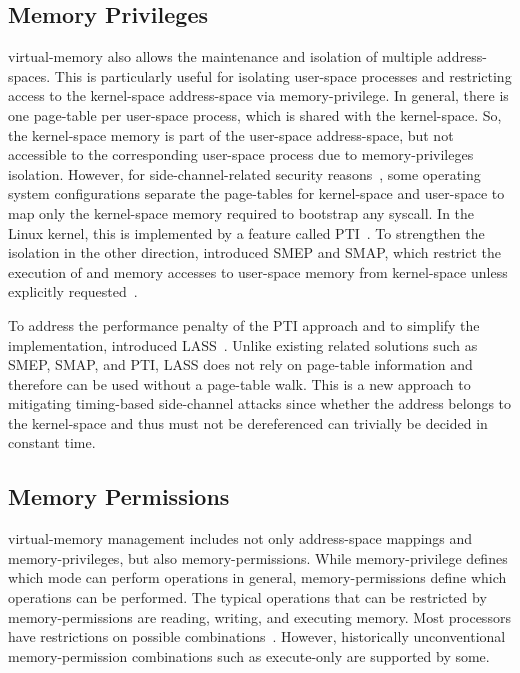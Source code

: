 \subsection{Memory Privileges}
\label{sec:mem_privileges}

\Gls{virtual-memory} also allows the maintenance and isolation of multiple \glspl{address-space}. This is particularly useful for isolating \gls{user-space} processes and restricting access to the \gls{kernel-space} \gls{address-space} via \gls{memory-privilege}. In general, there is one \gls{page-table} per \gls{user-space} process, which is shared with the \gls{kernel-space}. So, the \gls{kernel-space} memory is part of the \gls{user-space} \gls{address-space}, but not accessible to the corresponding \gls{user-space} process due to \glspl{memory-privilege} isolation. However, for \gls{side-channel}-related security reasons~\cite{meltdown,kaiser}, some operating system configurations separate the \glspl{page-table} for \gls{kernel-space} and \gls{user-space} to map only the \gls{kernel-space} memory required to bootstrap any \gls{syscall}. In the Linux kernel, this is implemented by a feature called \gls{PTI}~\cite{pti}. To strengthen the isolation in the other direction,  introduced \gls{SMEP} and \gls{SMAP}, which restrict the execution of and memory accesses to \gls{user-space} memory from \gls{kernel-space} unless explicitly requested~\cite{ia32}.

To address the performance penalty of the \gls{PTI} approach and to simplify the implementation,  introduced \gls{LASS}~\cite{ia32-ext}. Unlike existing related solutions such as \gls{SMEP}, \gls{SMAP}, and \gls{PTI}, \gls{LASS} does not rely on \gls{page-table} information and therefore can be used without a \gls{page-table} walk. This is a new approach to mitigating timing-based \gls{side-channel} attacks since whether the address belongs to the \gls{kernel-space} and thus must not be dereferenced can trivially be decided in constant time.

\subsection{Memory Permissions}
\label{sec:mem_perms}

\Gls{virtual-memory} management includes not only \gls{address-space} mappings and \glspl{memory-privilege}, but also \glspl{memory-permission}. While \gls{memory-privilege} defines which  mode can perform operations in general, \glspl{memory-permission} define which operations can be performed. The typical operations that can be restricted by \glspl{memory-permission} are reading, writing, and executing memory. Most processors have restrictions on possible combinations~\cite{ia32}. However, historically unconventional \gls{memory-permission} combinations such as execute-only are supported by some.

